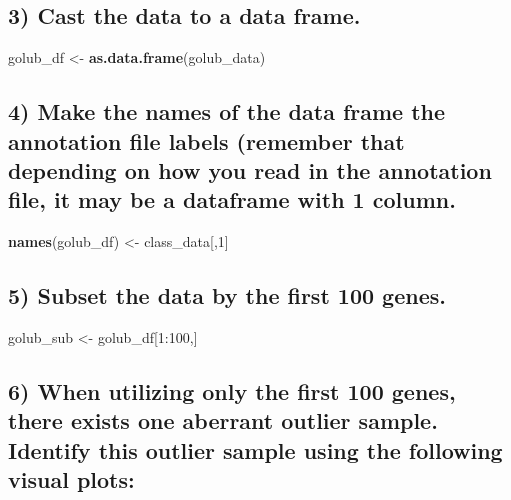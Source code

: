 \documentclass[]{article}
\newenvironment{Shaded}{\begin{snugshade}}{\end{snugshade}}
\newcommand{\KeywordTok}[1]{\textcolor[rgb]{0.13,0.29,0.53}{\textbf{{#1}}}}
\newcommand{\DecValTok}[1]{\textcolor[rgb]{0.00,0.00,0.81}{{#1}}}
\newcommand{\StringTok}[1]{\textcolor[rgb]{0.31,0.60,0.02}{{#1}}}
\newcommand{\NormalTok}[1]{{#1}}
\begin{document}
\subsection{3) Cast the data to a data
frame.}\label{cast-the-data-to-a-data-frame.}

\begin{Shaded}
\begin{Highlighting}[]
\NormalTok{golub_df <-}\StringTok{ }\KeywordTok{as.data.frame}\NormalTok{(golub_data)}
\end{Highlighting}
\end{Shaded}

\subsection{4) Make the names of the data frame the annotation file
labels (remember that depending on how you read in the annotation file,
it may be a dataframe with 1
column.}\label{make-the-names-of-the-data-frame-the-annotation-file-labels-remember-that-depending-on-how-you-read-in-the-annotation-file-it-may-be-a-dataframe-with-1-column.}

\begin{Shaded}
\begin{Highlighting}[]
\KeywordTok{names}\NormalTok{(golub_df) <-}\StringTok{ }\NormalTok{class_data[,}\DecValTok{1}\NormalTok{]}
\end{Highlighting}
\end{Shaded}

\subsection{5) Subset the data by the first 100
genes.}\label{subset-the-data-by-the-first-100-genes.}

\begin{Shaded}
\begin{Highlighting}[]
\NormalTok{golub_sub <-}\StringTok{ }\NormalTok{golub_df[}\DecValTok{1}\NormalTok{:}\DecValTok{100}\NormalTok{,]}
\end{Highlighting}
\end{Shaded}

\newpage

\subsection{6) When utilizing only the first 100 genes, there exists one
aberrant outlier sample. Identify this outlier sample using the
following visual
plots:}\label{when-utilizing-only-the-first-100-genes-there-exists-one-aberrant-outlier-sample.-identify-this-outlier-sample-using-the-following-visual-plots}
\end{document}

